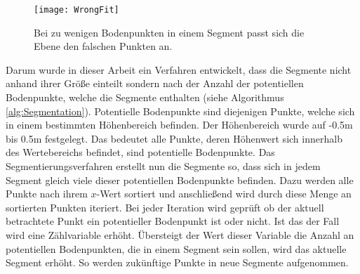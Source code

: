 \begin{figure}%
	\centering
    \texttt{[image: WrongFit]}
    \caption{Bei zu wenigen Bodenpunkten in einem Segment passt sich die Ebene den falschen Punkten an.}
    \label{fig:WrongFit}
\end{figure}

Darum wurde in dieser Arbeit ein Verfahren entwickelt, dass die Segmente nicht anhand ihrer Größe einteilt sondern nach der Anzahl der potentiellen Bodenpunkte, welche die Segmente enthalten (siehe Algorithmus \ref{alg:Segmentation}). Potentielle Bodenpunkte sind diejenigen Punkte, welche sich in einem bestimmten Höhenbereich befinden. Der Höhenbereich wurde auf -0.5m bis 0.5m festgelegt. Das bedeutet alle Punkte, deren Höhenwert sich innerhalb des Wertebereichs befindet, sind potentielle Bodenpunkte. Das Segmentierungsverfahren erstellt nun die Segmente so, dass sich in jedem Segment gleich viele dieser potentiellen Bodenpunkte befinden. Dazu werden alle Punkte nach ihrem $x$-Wert sortiert und anschließend wird durch diese Menge an sortierten Punkten iteriert. Bei jeder Iteration wird geprüft ob der aktuell betrachtete Punkt ein potentieller Bodenpunkt ist oder nicht. Ist das der Fall wird eine Zählvariable erhöht. Übersteigt der Wert dieser Variable die Anzahl an potentiellen Bodenpunkten, die in einem Segment sein sollen, wird das aktuelle Segment erhöht. So werden zukünftige Punkte in neue Segmente aufgenommen.  

